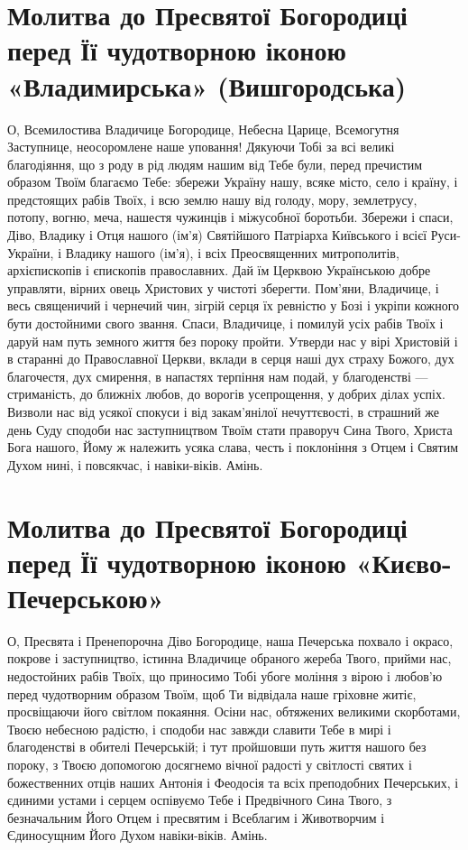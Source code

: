 \documentclass[chapters.tex]{subfiles}
\begin{document}
\section{Молитва до Пресвятої Богородиці перед Її чудотворною іконою «Владимирська» (Вишгородська)}
О, Всемилостива Владичице Богородице, Небесна Царице, Всемогутня Заступнице, неосоромлене наше уповання! Дякуючи Тобі за всі великі благодіяння, що з роду в рід людям нашим від Тебе були, перед пречистим образом Твоїм благаємо Тебе: збережи Україну нашу, всяке місто, село і країну, і предстоящих рабів Твоїх, і всю землю нашу від голоду, мору, землетрусу, потопу, вогню, меча, нашестя чужинців і міжусобної боротьби. Збережи і спаси, Діво, Владику і Отця нашого (ім’я) Святійшого Патріарха Київського і всієї Руси-України, і Владику нашого (ім’я), і всіх Преосвященних митрополитів, архієпископів і єпископів православних. Дай їм Церквою Українською добре управляти, вірних овець Христових у чистоті зберегти. Пом’яни, Владичице, і весь священичий і чернечий чин, зігрій серця їх ревністю у Бозі і укріпи кожного бути достойними свого звання. Спаси, Владичице, і помилуй усіх рабів Твоїх і даруй нам путь земного життя без пороку пройти. Утверди нас у вірі Христовій і в старанні до Православної Церкви, вклади в серця наші дух страху Божого, дух благочестя, дух смирення, в напастях терпіння нам подай, у благоденстві — стриманість, до ближніх любов, до ворогів усепрощення, у добрих ділах успіх. Визволи нас від усякої спокуси і від закам’янілої нечуттєвості, в страшний же день Суду сподоби нас заступництвом Твоїм стати праворуч Сина Твого, Христа Бога нашого, Йому ж належить усяка слава, честь і поклоніння з Отцем і Святим Духом нині, і повсякчас, і навіки-віків. Амінь.

\section{Молитва до Пресвятої Богородиці перед Її чудотворною іконою «Києво-Печерською»}
О, Пресвята і Пренепорочна Діво Богородице, наша Печерська похвало і окрасо, покрове і заступництво, істинна Владичице обраного жереба Твого, прийми нас, недостойних рабів Твоїх, що приносимо Тобі убоге моління з вірою і любов’ю перед чудотворним образом Твоїм, щоб Ти відвідала наше гріховне житіє, просвіщаючи його світлом покаяння. Осіни нас, обтяжених великими скорботами, Твоєю небесною радістю, і сподоби нас завжди славити Тебе в мирі і благоденстві в обителі Печерській; і тут пройшовши путь життя нашого без пороку, з Твоєю допомогою досягнемо вічної радості у світлості святих і божественних отців наших Антонія і Феодосія та всіх преподобних Печерських, і єдиними устами і серцем оспівуємо Тебе і Предвічного Сина Твого, з безначальним Його Отцем і пресвятим і Всеблагим і Животворчим і Єдиносущним Його Духом навіки-віків. Амінь.
\end{document}
